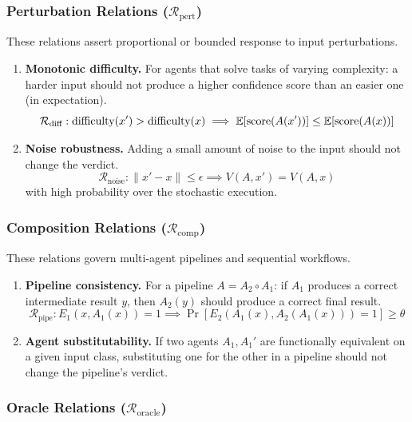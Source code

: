 \subsubsection{Perturbation Relations ($\mathcal{R}_{\text{pert}}$)}

These relations assert proportional or bounded response to input
perturbations.

\begin{enumerate}[leftmargin=*]
  \item \textbf{Monotonic difficulty.} For agents that solve tasks of
    varying complexity: a harder input should not produce a higher
    confidence score than an easier one (in expectation).
    \[
      \mathcal{R}_{\text{diff}}: \text{difficulty}(x') > \text{difficulty}(x)
        \implies \mathbb{E}[\text{score}(A(x'))] \leq \mathbb{E}[\text{score}(A(x))]
    \]

  \item \textbf{Noise robustness.} Adding a small amount of noise to the
    input should not change the verdict.
    \[
      \mathcal{R}_{\text{noise}}: \|x' - x\| \leq \epsilon
        \implies V(A, x') = V(A, x)
    \]
    with high probability over the stochastic execution.
\end{enumerate}

\subsubsection{Composition Relations ($\mathcal{R}_{\text{comp}}$)}

These relations govern multi-agent pipelines and sequential workflows.

\begin{enumerate}[leftmargin=*]
  \item \textbf{Pipeline consistency.} For a pipeline $A = A_2 \circ A_1$:
    if $A_1$ produces a correct intermediate result $y$, then $A_2(y)$
    should produce a correct final result.
    \[
      \mathcal{R}_{\text{pipe}}: E_1(x, A_1(x)) = 1
        \implies \Pr[E_2(A_1(x), A_2(A_1(x))) = 1] \geq \theta
    \]

  \item \textbf{Agent substitutability.} If two agents $A_1, A_1'$ are
    functionally equivalent on a given input class, substituting one for
    the other in a pipeline should not change the pipeline's verdict.
\end{enumerate}

\subsubsection{Oracle Relations ($\mathcal{R}_{\text{oracle}}$)}

